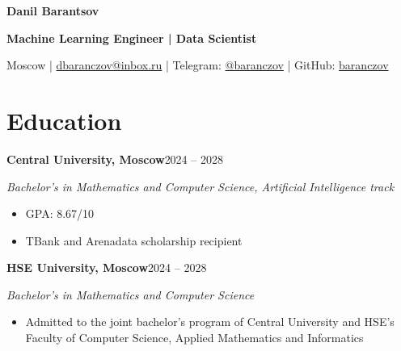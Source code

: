 \documentclass[a4paper,11pt]{article}
\newcommand{\entry}[3]{\textbf{#1}\hfill #3\par\textit{#2}\par}
\begin{document}
\fontsize{10.5}{13}\selectfont
\begin{center}
{\fontsize{14.3}{17}\selectfont\bfseries Danil Barantsov}\par
{\bfseries Machine Learning Engineer | Data Scientist}\par
Moscow | \href{mailto:dbaranczov@inbox.ru}{dbaranczov@inbox.ru} |
Telegram: \href{https://t.me/baranczov}{@baranczov} |
GitHub: \href{https://github.com/baranczov}{baranczov}
\end{center}
\vspace{-2pt}
\section*{Education}
\entry{Central University, Moscow}{Bachelor's in Mathematics and Computer Science, Artificial Intelligence track}{2024 -- 2028}
\begin{itemize}
\item GPA: 8.67/10
\item TBank and Arenadata scholarship recipient
\end{itemize}
\vspace{3pt}
\entry{HSE University, Moscow}{Bachelor's in Mathematics and Computer Science}{2024 -- 2028}
\begin{itemize}
\item Admitted to the joint bachelor's program of Central University and HSE's Faculty of Computer Science, Applied Mathematics and Informatics
\end{itemize}
\begingroup
{}
\end{document}
